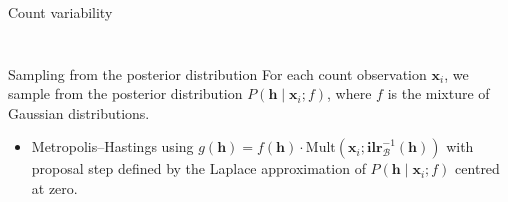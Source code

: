 \documentclass[9pt]{beamer}
\begin{document}
\begin{frame}[t]{Count variability}
\begin{columns}
\begin{column}{0.5\textwidth}
\begin{figure}
%
\end{figure}
\end{column}
\end{columns}

\vspace{-0.2cm}
\begin{exampleblock}{Sampling from the posterior distribution}
For each count observation $\textbf{x}_i$, we sample from the posterior distribution $P(\textbf{h} \mid \textbf{x}_i; f)$, where $f$ is the mixture of Gaussian distributions.
\begin{itemize}
\item Metropolis–Hastings using $g(\textbf{h}) = f(\textbf{h})\cdot\text{Mult}(\textbf{x}_i; \textbf{ilr}_\mathcal{B}^{-1}(\textbf{h}))$ with proposal step defined by the Laplace approximation of $P(\textbf{h} \mid \textbf{x}_i; f)$ centred at zero.
\end{itemize}
\end{exampleblock}


\end{frame}
\end{document}
